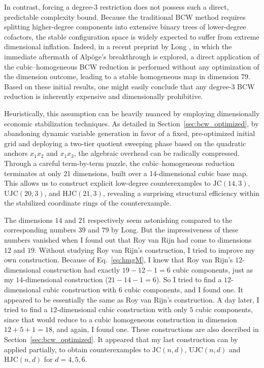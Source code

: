 \documentclass[11pt,a4paper]{article}
\begin{document}
In contrast, forcing a degree-3 restriction does not possess such a direct, predictable complexity bound. Because the traditional BCW method requires splitting higher-degree components into extensive binary trees of lower-degree cofactors, the stable configuration space is widely expected to suffer from extreme dimensional inflation. Indeed, in a recent preprint by Long \cite{long2026}, in which the immediate aftermath of Alpöge's breakthrough is explored, a direct application of the cubic--homogeneous BCW reduction is performed without any optimization of the dimension outcome, leading to a stable homogeneous map in dimension 79. Based on these initial results, one might easily conclude that any degree-3 BCW reduction is inherently expensive and dimensionally prohibitive.

Heuristically, this assumption can be heavily nuanced by employing dimensionally economic stabilization techniques. As detailed in Section~\ref{sec:bcw_optimized}, by abandoning dynamic variable generation in favor of a fixed, pre-optimized initial grid and deploying a two-tier quotient sweeping phase based on the quadratic anchors $x_1 x_2$ and $x_1 x_3$, the algebraic overhead can be radically compressed. Through a careful term-by-term puzzle, the cubic--homogeneous reduction terminates at only 21 dimensions, built over a 14-dimensional cubic base map. This allows us to construct explicit low-degree counterexamples to $\mathrm{JC}(14,3)$, $\mathrm{UJC}(20,3)$, and $\mathrm{HJC}(21,3)$, revealing a surprising structural efficiency within the stabilized coordinate rings of the counterexample.

The dimensions $14$ and $21$ respectively seem astonishing compared to the corresponding numbers $39$ and $79$ by Long. But the impressiveness of these numbers vanished when I found out that Roy van Rijn had come to dimensions $12$ and $19$. Without studying Roy van Rijn's construction, I tried to improve my own construction. Because of Eq.~\eqref{eq:hmgM}, I knew that Roy van Rijn's $12$-dimensional construction had exactly $19 - 12 - 1 = 6$ cubic components, just as my $14$-dimensional construction ($21 - 14 - 1 = 6$). So I tried to find a $12$-dimensional cubic construction with $6$ cubic components, and I found one. It appeared to be essentially the same as Roy van Rijn's construction. A day later, I tried to find a $12$-dimensional cubic construction with only $5$ cubic components, since that would reduce to a cubic homogeneous construction in dimension $12 + 5 + 1 = 18$, and again, I found one. These constructions are also described in Section~\ref{sec:bcw_optimized}. It appeared that my last construction can by applied partially, to obtain counterexamples to $\mathrm{JC}(n,d)$, $\mathrm{UJC}(n,d)$ and $\mathrm{HJC}(n,d)$ for $d = 4, 5, 6$.
\end{document}
